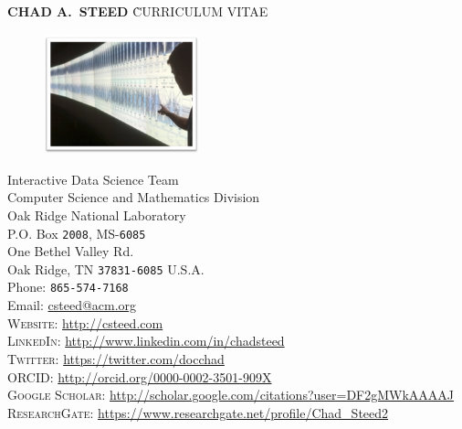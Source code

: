 \documentclass[11pt, letterpaper]{article}
\begin{document}
\thispagestyle{firststyle}



\begin{tabbing}
    {\sffamily \LARGE \textbf{CHAD A.\ STEED}} \` {\sffamily \LARGE CURRICULUM VITAE}
\end{tabbing}


\begin{figure}
  \vspace{-30pt}
  \begin{center}
    \includegraphics[width=0.4\textwidth]{climate-framed.png}
  \end{center}
  \vspace{-20pt}
\end{figure}

Interactive Data Science Team\\
Computer Science and Mathematics Division\\
Oak Ridge National Laboratory\\
P.O. Box \texttt{2008}, MS-\texttt{6085}\\
One Bethel Valley Rd.\\
Oak Ridge, TN \texttt{37831-6085}
U.S.A.\\[.2cm]
Phone: \texttt{865-574-7168}\\
Email: \href{mailto:csteed@acm.org}{csteed@acm.org}\\[.2cm]
\textsc{Website}: \href{http://csteed.com}{http://csteed.com}\\
\textsc{LinkedIn}: \href{http://www.linkedin.com/in/chadsteed}{http://www.linkedin.com/in/chadsteed}\\
\textsc{Twitter}: \href{https://twitter.com/docchad}{https://twitter.com/docchad}\\
\textsc{ORCID}:
\href{http://orcid.org/0000-0002-3501-909X}{http://orcid.org/0000-0002-3501-909X}\\
\textsc{Google Scholar}: \href{http://scholar.google.com/citations?user=DF2gMWkAAAAJ}{http://scholar.google.com/citations?user=DF2gMWkAAAAJ}\\
\textsc{ResearchGate}: \href{https://www.researchgate.net/profile/Chad\_Steed2}{https://www.researchgate.net/profile/Chad\_Steed2}
\end{document}
